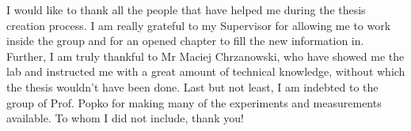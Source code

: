 \documentclass[12pt,twoside]{report}
\numberwithin{equation}{subsection}
\begin{document}
I would like to thank all the people that have helped me during the thesis creation process. I am really grateful to my Supervisor for allowing me to work inside the group and for an opened chapter to fill the new information in. Further, I am truly thankful to Mr Maciej Chrzanowski, who have showed me the lab and instructed me with a great amount of technical knowledge, without which the thesis wouldn't have been done. Last but not least, I am indebted to the group of Prof. Popko for making many of the experiments and measurements available. To whom I did not include, thank you!

\tableofcontents
\listoffigures 
\listoftables












\printbibliography
\end{document}
